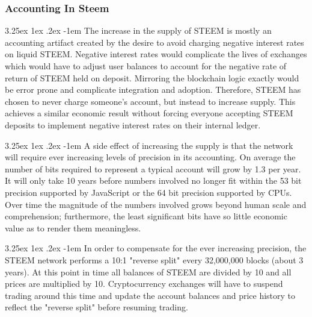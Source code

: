 \documentclass{article}
\makeatletter
\renewcommand\paragraph{\@startsection{paragraph}{5}{\z@}%
  {3.25ex \@plus1ex \@minus.2ex}%
  {-1em}%
  {\normalfont\normalsize\bfseries}}
\makeatother
\begin{document}
            \subsubsection{Accounting In Steem}

                \paragraph{}
                    The increase in the supply of STEEM is mostly an accounting artifact created by the desire to avoid charging negative interest rates on liquid STEEM. Negative interest rates would complicate the lives of exchanges which would have to adjust user balances to account for the negative rate of return of STEEM held on deposit. Mirroring the blockchain logic exactly would be error prone and complicate integration and adoption. Therefore, STEEM has chosen to never charge someone's account, but instead to increase supply. This achieves a similar economic result without forcing everyone accepting STEEM deposits to implement negative interest rates on their internal ledger.

                \paragraph{}
                    A side effect of increasing the supply is that the network will require ever increasing levels of precision in its accounting. On average the number of bits required to represent a typical account will grow by 1.3 per year. It will only take 10 years before numbers involved no longer fit within the 53 bit precision supported by JavaScript or the 64 bit precision supported by CPUs. Over time the magnitude of the numbers involved grows beyond human scale and comprehension; furthermore, the least significant bits have so little economic value as to render them meaningless.

                \paragraph{}
                    In order to compensate for the ever increasing precision, the STEEM network performs a 10:1 "reverse split" every 32,000,000 blocks (about 3 years). At this point in time all balances of STEEM are divided by 10 and all prices are multiplied by 10. Cryptocurrency exchanges will have to suspend trading around this time and update the account balances and price history to reflect the "reverse split" before resuming trading.
\end{document}
